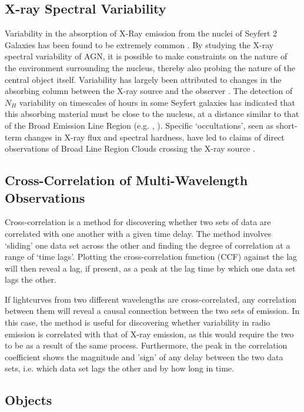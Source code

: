\documentclass[letters,useAMS,usenatbib]{samnote}
\begin{document}
\subsection{X-ray Spectral Variability}

Variability in the absorption of X-Ray emission from the nuclei of Seyfert 2 Galaxies has been found to be extremely common \citep{risaliti02}. By studying the X-ray
spectral variability  of AGN, it is possible to make constraints on the nature of the environment surrounding the nucleus, thereby also probing the nature of
the central object itself. Variability has largely been attributed to changes in the absorbing column between  the X-ray source and the observer \citep{risaliti02}.
The detection of $N_H$ variability  on timescales of hours in some Seyfert galaxies has indicated that this absorbing material must be close to the nucleus, at a
distance similar to that of the Broad Emission Line Region (e.g. \citet{elvis04}, \citet{puccetti}). Specific `occultations', seen as short-term changes in X-ray flux and
spectral hardness, have led to claims of direct observations of Broad Line Region Clouds crossing the X-ray source \citep{risaliti07a}. 

\subsection{Cross-Correlation of Multi-Wavelength Observations}

Cross-correlation is a method for discovering whether two sets of data are correlated with one another with a given time delay. The method involves `sliding'
one data set across the other and finding the degree of correlation at a range of `time lags'. Plotting the cross-correlation function (CCF) against the lag will then
reveal a lag, if present, as a peak at the lag time by which one data set lags the other. 

If lightcurves from two different wavelengths are cross-correlated, any correlation between them will reveal a causal connection between the two sets of emission.  In
this case, the method is useful for discovering whether variability in radio emission is correlated with that of X-ray emission, as this would require the two to be as a
result of the same process. Furthermore, the peak in the correlation coefficient shows the magnitude and 'sign' of any delay between the two data sets, i.e. which data
set lags the other and by how long in time.

\subsection{Objects}
\end{document}
